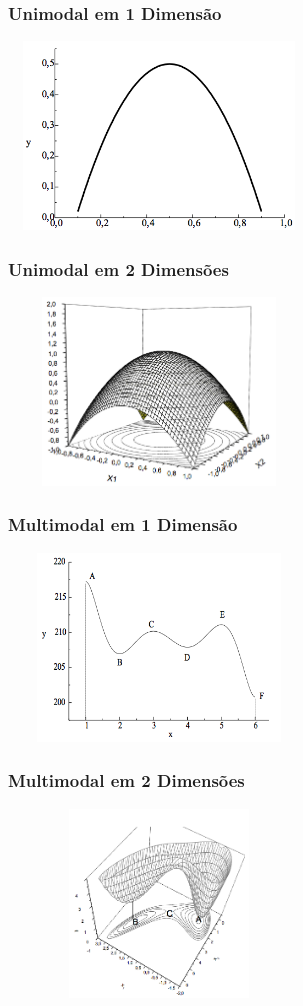 \documentclass{beamer}
\begin{document}
\begin{frame}
	\centering
	{
	\frametitle{Unimodal em 1 Dimensão}
	\includegraphics[width=8cm,height=5cm]{unimodal1.png}	
	}
	{
	\frametitle{Unimodal em 2 Dimensões}
	\includegraphics[width=8cm,height=5cm]{unimodal2.png}	
	}
	{
	\frametitle{Multimodal em 1 Dimensão}
	\includegraphics[width=8cm,height=5cm]{multimodal1.png}	
	}
	{
	\frametitle{Multimodal em 2 Dimensões}
	\includegraphics[width=8cm,height=5cm]{multimodal2.png}	
	}
\end{frame}
\end{document}
